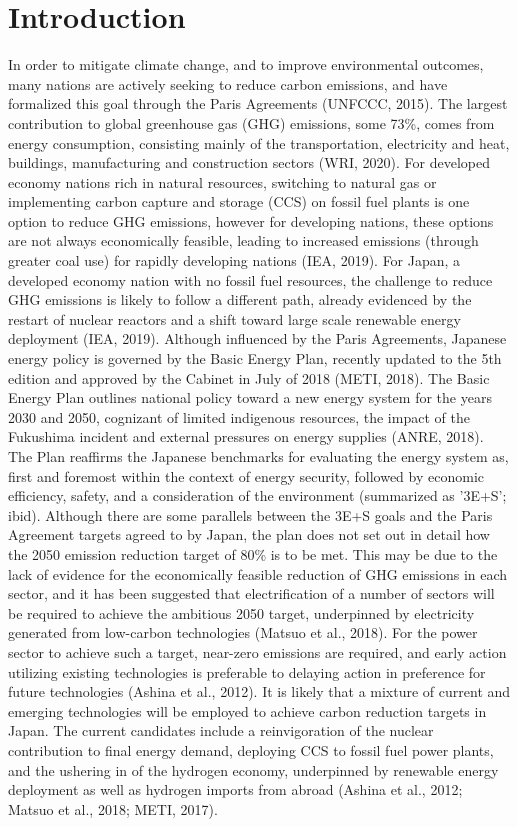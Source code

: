 \section{Introduction} \label{Introduction}
In order to mitigate climate change, and to improve environmental outcomes, many nations are actively seeking to reduce carbon emissions, and have formalized this goal through the Paris Agreements (UNFCCC, 2015). The largest contribution to global greenhouse gas (GHG) emissions, some 73\%, comes from energy consumption, consisting mainly of the transportation, electricity and heat, buildings, manufacturing and construction sectors (WRI, 2020). For developed economy nations rich in natural resources, switching to natural gas or implementing carbon capture and storage (CCS) on fossil fuel plants is one option to reduce GHG emissions, however for developing nations, these options are not always economically feasible, leading to increased emissions (through greater coal use) for rapidly developing nations (IEA, 2019). For Japan, a developed economy nation with no fossil fuel resources, the challenge to reduce GHG emissions is likely to follow a different path, already evidenced by the restart of nuclear reactors and a shift toward large scale renewable energy deployment (IEA, 2019).
Although influenced by the Paris Agreements, Japanese energy policy is governed by the Basic Energy Plan, recently updated to the 5th edition and approved by the Cabinet in July of 2018 (METI, 2018). The Basic Energy Plan outlines national policy toward a new energy system for the years 2030 and 2050, cognizant of limited indigenous resources, the impact of the Fukushima incident and external pressures on energy supplies (ANRE, 2018). The Plan reaffirms the Japanese benchmarks for evaluating the energy system as, first and foremost within the context of energy security, followed by economic efficiency, safety, and a consideration of the environment (summarized as '3E+S'; ibid). Although there are some parallels between the 3E+S goals and the Paris Agreement targets agreed to by Japan, the plan does not set out in detail how the 2050 emission reduction target of 80\% is to be met. This may be due to the lack of evidence for the economically feasible reduction of GHG emissions in each sector, and it has been suggested that electrification of a number of sectors will be required to achieve the ambitious 2050 target, underpinned by electricity generated from low-carbon technologies (Matsuo et al., 2018). For the power sector to achieve such a target, near-zero emissions are required, and early action utilizing existing technologies is preferable to delaying action in preference for future technologies (Ashina et al., 2012). It is likely that a mixture of current and emerging technologies will be employed to achieve carbon reduction targets in Japan. The current candidates include a reinvigoration of the nuclear contribution to final energy demand, deploying CCS to fossil fuel power plants, and the ushering in of the hydrogen economy, underpinned by renewable energy deployment as well as hydrogen imports from abroad (Ashina et al., 2012; Matsuo et al., 2018; METI, 2017). 
